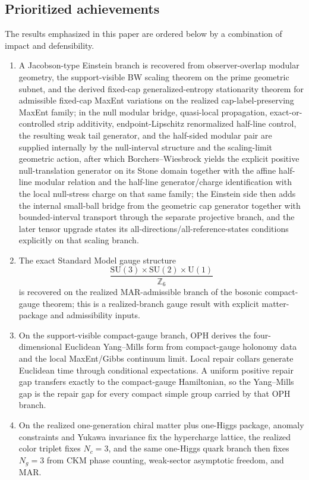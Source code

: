 \documentclass[11pt]{article}
\newcommand{\SU}{\mathrm{SU}}
\newcommand{\U}{\mathrm{U}}
\begin{document}
\subsection*{Prioritized achievements}

The results emphasized in this paper are ordered below by a combination of impact and defensibility.

\begin{enumerate}[leftmargin=2em]
\item A Jacobson-type Einstein branch is recovered from observer-overlap modular geometry, the support-visible BW scaling theorem on the prime geometric subnet, and the derived fixed-cap generalized-entropy stationarity theorem for admissible fixed-cap MaxEnt variations on the realized cap-label-preserving MaxEnt family; in the null modular bridge, quasi-local propagation, exact-or-controlled strip additivity, endpoint-Lipschitz renormalized half-line control, the resulting weak tail generator, and the half-sided modular pair are supplied internally by the null-interval structure and the scaling-limit geometric action, after which Borchers--Wiesbrock yields the explicit positive null-translation generator on its Stone domain together with the affine half-line modular relation and the half-line generator/charge identification with the local null-stress charge on that same family; the Einstein side then adds the internal small-ball bridge from the geometric cap generator together with bounded-interval transport through the separate projective branch, and the later tensor upgrade states its all-directions/all-reference-states conditions explicitly on that scaling branch.
\item The exact Standard Model gauge structure
\[
\frac{\SU(3)\times\SU(2)\times\U(1)}{\mathbb Z_6}
\]
is recovered on the realized MAR-admissible branch of the bosonic compact-gauge theorem; this is a realized-branch gauge result with explicit matter-package and admissibility inputs.
\item On the support-visible compact-gauge branch, OPH derives the four-dimensional
Euclidean Yang--Mills form from compact-gauge holonomy data and the local MaxEnt/Gibbs
continuum limit. Local repair collars generate Euclidean time through conditional
expectations. A uniform positive repair gap transfers exactly to the compact-gauge Hamiltonian, so
the Yang--Mills gap is the repair gap for every compact simple group carried by that OPH branch.
\item On the realized one-generation chiral matter plus one-Higgs package, anomaly constraints and Yukawa invariance fix the hypercharge lattice, the realized color triplet fixes \(N_c=3\), and the same one-Higgs quark branch then fixes \(N_g=3\) from CKM phase counting, weak-sector asymptotic freedom, and MAR.

\end{enumerate}
\end{document}
